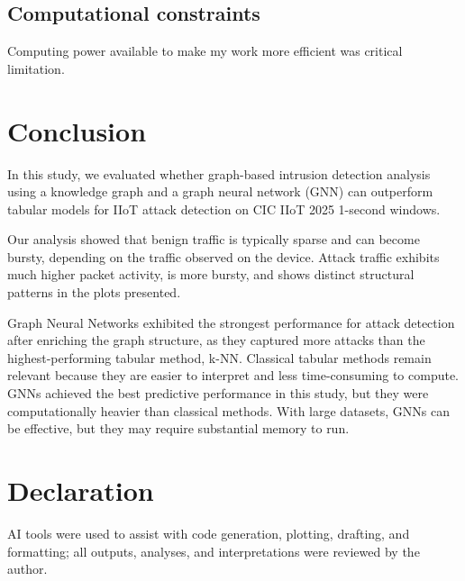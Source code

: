 \documentclass[final,5p,times,twocolumn]{elsarticle}
\begin{document}
\subsection{Computational constraints}
Computing power available to make my work more efficient was critical limitation.


\section{Conclusion}
\label{Conclusion} 
In this study, we evaluated whether graph-based intrusion detection analysis using a knowledge graph and a graph neural network (GNN) can outperform tabular models for IIoT attack detection on CIC IIoT 2025 1-second windows.

Our analysis showed that benign traffic is typically sparse and can become bursty, depending on the traffic observed on the device. Attack traffic exhibits much higher packet activity, is more bursty, and shows distinct structural patterns in the plots presented.

Graph Neural Networks exhibited the strongest performance for attack detection after enriching the graph structure, as they captured more attacks than the highest-performing tabular method, k-NN. Classical tabular methods remain relevant because they are easier to interpret and less time-consuming to compute. GNNs achieved the best predictive performance in this study, but they were computationally heavier than classical methods. With large datasets, GNNs can be effective, but they may require substantial memory to run.

\section*{Declaration}
AI tools were used to assist with code generation, plotting, drafting, and formatting; all outputs, analyses, and interpretations were reviewed by the author.
\end{document}
